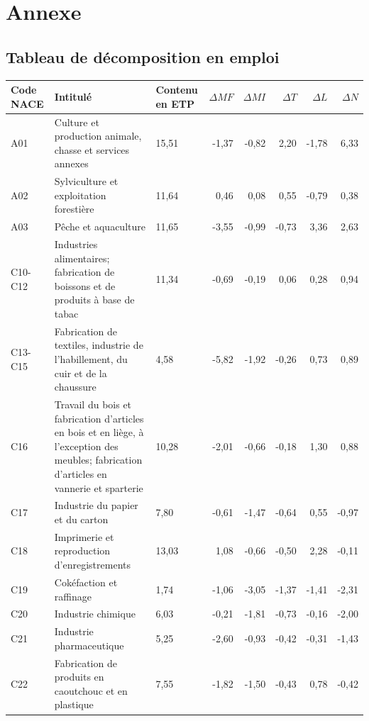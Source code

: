 \section{Annexe}

\subsection{Tableau de décomposition en emploi}
\label{app:tableau_ce}

\begin{small}
\begin{longtable}{m{1.3cm}m{5.7cm}m{1cm}rrrrr} %
	\hline
	Code NACE & Intitulé & Contenu en ETP & $\Delta MF$ & $\Delta MI$ & $\Delta T$ & $\Delta L$ & $\Delta N$ \\ 
	\hline
	A01 & Culture et production animale, chasse et services annexes & 15,51 & -1,37 & -0,82 & 2,20 & -1,78 & 6,33 \\ 
	\hline
	A02 & Sylviculture et exploitation forestière & 11,64 & 0,46 & 0,08 & 0,55 & -0,79 & 0,38 \\ 
	\hline
	A03 & Pêche et aquaculture & 11,65 & -3,55 & -0,99 & -0,73 & 3,36 & 2,63 \\ 
	\hline
	C10-C12 & Industries alimentaires; fabrication de boissons et de produits à base de tabac & 11,34 & -0,69 & -0,19 & 0,06 & 0,28 & 0,94 \\ 
	\hline
	C13-C15 & Fabrication de textiles, industrie de l'habillement, du cuir et de la chaussure & 4,58 & -5,82 & -1,92 & -0,26 & 0,73 & 0,89 \\ 
	\hline
	C16 & Travail du bois et fabrication d'articles en bois et en liège, à l'exception des meubles; fabrication d'articles en vannerie et sparterie & 10,28 & -2,01 & -0,66 & -0,18 & 1,30 & 0,88 \\ 
	\hline
	C17 & Industrie du papier et du carton & 7,80 & -0,61 & -1,47 & -0,64 & 0,55 & -0,97 \\ 
	\hline
	C18 & Imprimerie et reproduction d'enregistrements & 13,03 & 1,08 & -0,66 & -0,50 & 2,28 & -0,11 \\ 
	\hline
	C19 & Cokéfaction et raffinage & 1,74 & -1,06 & -3,05 & -1,37 & -1,41 & -2,31 \\ 
	\hline
	C20 & Industrie chimique & 6,03 & -0,21 & -1,81 & -0,73 & -0,16 & -2,00 \\ 
	\hline
	C21 & Industrie pharmaceutique & 5,25 & -2,60 & -0,93 & -0,42 & -0,31 & -1,43 \\ 
	\hline
	C22 & Fabrication de produits en caoutchouc et en plastique & 7,55 & -1,82 & -1,50 & -0,43 & 0,78 & -0,42 \\ 

\end{longtable}
\end{small}
